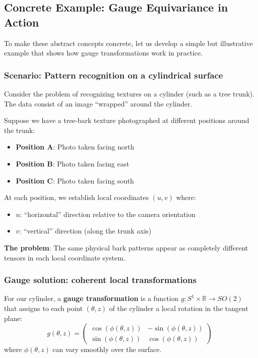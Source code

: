 \subsection{Concrete Example: Gauge Equivariance in Action}\label{subsec:ejemplo_gauge_equivarianza}

To make these abstract concepts concrete, let us develop a simple but illustrative example that shows how gauge transformations work in practice.

\subsubsection{Scenario: Pattern recognition on a cylindrical surface}

Consider the problem of recognizing textures on a cylinder (such as a tree trunk). The data consist of an image ``wrapped'' around the cylinder.

\begin{example}
Suppose we have a tree-bark texture photographed at different positions around the trunk:
\begin{itemize}
    \item \textbf{Position A}: Photo taken facing north
    \item \textbf{Position B}: Photo taken facing east
    \item \textbf{Position C}: Photo taken facing south
\end{itemize}

At each position, we establish local coordinates $(u,v)$ where:
\begin{itemize}
    \item $u$: ``horizontal'' direction relative to the camera orientation
    \item $v$: ``vertical'' direction (along the trunk axis)
\end{itemize}

\textbf{The problem}: The same physical bark patterns appear as completely different tensors in each local coordinate system.
\end{example}

\subsubsection{Gauge solution: coherent local transformations}

\begin{definition}
For our cylinder, a \textbf{gauge transformation} is a function $g: S^1 \times \mathbb{R} \to SO(2)$ that assigns to each point $(\theta, z)$ of the cylinder a local rotation in the tangent plane:
\begin{equation}
g(\theta, z) = \begin{pmatrix}
\cos(\phi(\theta, z)) & -\sin(\phi(\theta, z)) \\
\sin(\phi(\theta, z)) & \cos(\phi(\theta, z))
\end{pmatrix}
\end{equation}
where $\phi(\theta, z)$ can vary smoothly over the surface.
\end{definition}

